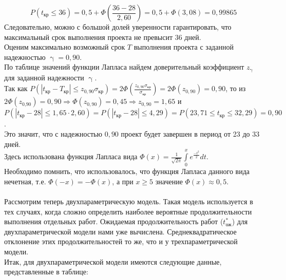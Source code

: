 \documentclass[a4paper, 12pt]{report}
\renewcommand{\leq}{\leqslant}
\renewcommand{\geq}{\geqslant}
\renewcommand{\gamma}{\upgamma}
\begin{document}
	$$P(t_\text{кр}\leq 36)=0,5+\Phi\left(\frac{36-28}{2,60}\right)=0,5+\Phi(3,08) = 0,99865$$
	Следовательно, можно с большой долей уверенности гарантировать, что максимальный срок выполнения проекта не превысит $36$ дней.\\
	Оценим максимально возможный срок $T$ выполнения проекта с заданной надежностью $\gamma = 0,90$.\\
	По таблице значений функции Лапласа найдем доверительный коэффициент $z_\gamma$ для заданной надежности $\gamma$.\\
	Так как $P(|t_\text{кр}-T_\text{кр}|\leq z_{0,90}\sigma_\text{кр})=2\Phi\left(\frac{z_{0,90}\sigma_\text{кр}}{\sigma_\text{кр}}\right)=2\Phi(z_{0,90})=0,90$, то из $2\Phi(z_\text{0,90})=0,90\Longrightarrow \Phi(z_{0,90})=0,45\Longrightarrow z_{0,90}=1,65$ и $P(|t_\text{кр}-28|\leq 1,65\cdot 2,60)=P(|t_\text{кр}-28|\leq 4,29)=P(23,71\leq t_\text{кр}\leq 32,29)=0,90$.\\
	Это значит, что с надежностью $0,90$ проект будет завершен в период от 23 до 33 дней.\\
	Здесь использована функция Лапласа вида $\Phi(x)=\frac{1}{\sqrt{2\pi}}\int\limits_0^xe^{\frac{-t^2}{2}}dt$.\\
	Необходимо помнить, что использовалось, что функция Лапласа данного вида нечетная, т.е. $\Phi(-x)=-\Phi(x)$, а при $x\geq 5$ значение $\Phi(x)\approx 0,5$.\\\\
	Рассмотрим теперь двухпараметрическую модель. Такая модель
	используется в тех случаях, когда сложно определить наиболее вероятные продолжительности выполнения отдельных работ. Ожидаемая
	продолжительность работ ($t_\text{ож}^*$) для двухпараметрической модели
	нами уже вычислена. Среднеквадратическое отклонение этих продолжительностей то же, что и у трехпараметрической модели.\\
	Итак, для двухпараметрической модели имеются следующие данные, представленные в таблице:\\
\end{document}
